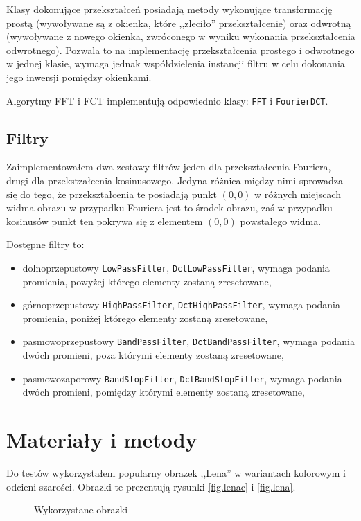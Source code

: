 \documentclass{classrep}
\begin{document}
Klasy dokonujące przekształceń posiadają metody wykonujące transformację prostą (wywoływane są z okienka, które ,,zleciło'' przekształcenie) oraz odwrotną (wywoływane z nowego okienka, zwróconego w wyniku wykonania przekształcenia odwrotnego). Pozwala to na implementację przekształcenia prostego i odwrotnego w jednej klasie, wymaga jednak współdzielenia instancji filtru w celu dokonania jego inwersji pomiędzy okienkami.

Algorytmy FFT i FCT implementują odpowiednio klasy: \verb|FFT| i \verb|FourierDCT|.

\subsection{Filtry}
Zaimplementowałem dwa zestawy filtrów \ppauza jeden dla przekształcenia Fouriera, drugi dla przekstzałcenia kosinusowego. Jedyna różnica między nimi sprowadza się do tego, że przekształcenia te posiadają punkt $(0, 0)$ w różnych miejscach widma obrazu \ppauza w przypadku Fouriera jest to środek obrazu, zaś w przypadku kosinusów punkt ten pokrywa się z elementem $(0, 0)$ powstałego widma.

Dostępne filtry to:
\begin{itemize}
 \item dolnoprzepustowy \ppauza \verb|LowPassFilter|, \verb|DctLowPassFilter|, wymaga podania promienia, powyżej którego elementy zostaną zresetowane,
 \item górnoprzepustowy \ppauza \verb|HighPassFilter|, \verb|DctHighPassFilter|, wymaga podania promienia, poniżej którego elementy zostaną zresetowane,
 \item pasmowoprzepustowy \ppauza \verb|BandPassFilter|, \verb|DctBandPassFilter|, wymaga podania dwóch promieni, poza którymi elementy zostaną zresetowane,
 \item pasmowozaporowy \ppauza \verb|BandStopFilter|, \verb|DctBandStopFilter|, wymaga podania dwóch promieni, pomiędzy którymi elementy zostaną zresetowane,
\end{itemize}

\clearpage

\section{Materiały i metody}
Do testów wykorzystałem popularny obrazek ,,Lena'' w wariantach kolorowym i odcieni szarości. Obrazki te prezentują rysunki \ref{fig.lenac} i \ref{fig.lena}.

\begin{figure}
\noindent{}
\caption{Wykorzystane obrazki}
\end{figure}
\end{document}
